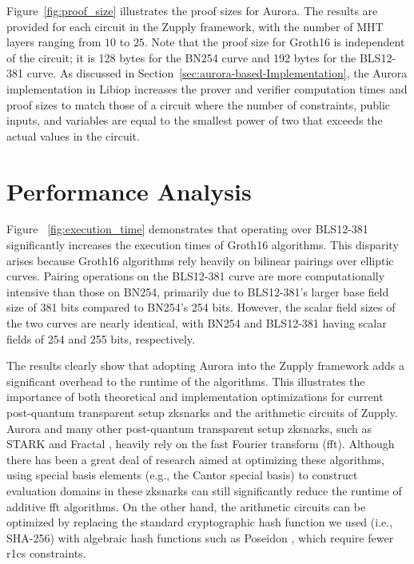 Figure~\ref{fig:proof_size} illustrates the proof sizes for Aurora. The results are provided for each circuit in the Zupply framework, with the number of \textsf{MHT} layers ranging from $10$ to $25$. Note that the proof size for Groth16 is independent of the circuit; it is 128 bytes for the BN254 curve and 192 bytes for the BLS12-381 curve. As discussed in Section~\ref{sec:aurora-based-Implementation}, the Aurora implementation in Libiop \cite{libiop} increases the prover and verifier computation times and proof sizes to match those of a circuit where the number of constraints, public inputs, and variables are equal to the smallest power of two that exceeds the actual values in the circuit. 

\section{Performance Analysis}


Figure ~\ref{fig:execution_time} demonstrates that operating over BLS12-381 significantly increases the execution times of Groth16 algorithms. This disparity arises because Groth16 algorithms rely heavily on bilinear pairings over elliptic curves. Pairing operations on the BLS12-381 curve are more computationally intensive than those on BN254, primarily due to BLS12-381's larger base field size of 381 bits compared to BN254's 254 bits. However, the scalar field sizes of the two curves are nearly identical, with BN254 and BLS12-381 having scalar fields of  254 and 255 bits, respectively. 

The results clearly show that adopting Aurora into the Zupply framework adds a significant overhead to the runtime of the algorithms. This illustrates the importance of both theoretical and implementation optimizations for current post-quantum transparent setup \gls{zksnark}s and the arithmetic circuits of Zupply. Aurora and many other post-quantum transparent setup \gls{zksnark}s, such as STARK \cite{Ben-Sasson2018STARK} and Fractal \cite{Chiesa2020Fractal}, heavily rely on the fast Fourier transform (\gls{fft}). Although there has been a great deal of research aimed at optimizing these algorithms, using special basis elements (e.g., the Cantor special basis) to construct evaluation domains in these \gls{zksnark}s can still significantly reduce the runtime of additive \gls{fft} algorithms. On the other hand, the arithmetic circuits can be optimized by replacing the standard cryptographic hash function we used (i.e., SHA-256) with algebraic hash functions such as Poseidon \cite{Grassi2021Poseidon}, which require fewer \gls{r1cs} constraints.

